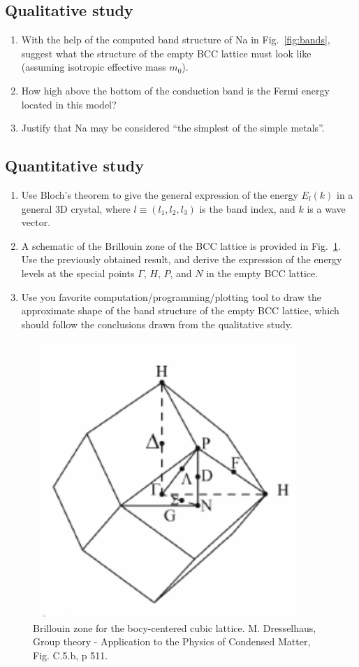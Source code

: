 \subsection{Qualitative study}

\begin{enumerate}[label=(\roman*)]
\item With the help of the computed band structure of Na in Fig.~\ref{fig:bands}, suggest what the structure of the empty BCC lattice must look
  like (assuming isotropic effective mass $m_0$).
\item How high above the bottom of the conduction band is the Fermi
  energy located in this model?
\item Justify that Na may be considered ``the simplest of the simple metals''.
\end{enumerate}

\subsection{Quantitative study}

\begin{enumerate}[label=(\roman*)]
\item Use Bloch's theorem to give the general expression of the energy
  $E_l(k)$ in a general 3D crystal, where $l \equiv (l_1,l_2,l_3)$ is
  the band index, and $k$ is a wave vector.
\item A schematic of the Brillouin zone of the
  BCC lattice is provided in Fig.~\ref{fig:lattice}. Use the previously
  obtained result, and derive the expression of the energy levels at
  the special points $\Gamma$, $H$, $P$, and  $N$ in the empty BCC lattice.
\item Use you favorite computation/programming/plotting tool to
  draw the approximate shape of the band structure of the empty BCC
  lattice, which should follow the conclusions drawn from the
  qualitative study.
\end{enumerate}

\begin{figure}[h]
  \centering
  \includegraphics[width=10cm]{BCC_lattice.pdf}
  \caption{Brillouin zone for the bocy-centered cubic
    lattice. M. Dresselhaus, Group theory - Application to the
    Physics of Condensed Matter, Fig. C.5.b, p 511. \label{fig:lattice}}
\end{figure}


